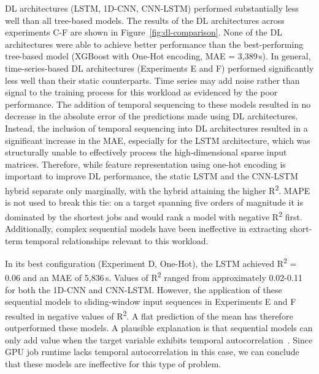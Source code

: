 DL architectures (LSTM, 1D-CNN, CNN-LSTM) performed substantially less well than all tree-based models. The results of the DL architectures across experiments C-F are shown in Figure~\ref{fig:dl-comparison}. None of the DL architectures were able to achieve better performance than the best-performing tree-based model (XGBoost with One-Hot encoding, MAE = 3{,}389\,s). In general, time-series-based DL architectures (Experiments E and F) performed significantly less well than their static counterparts. Time series may add noise rather than signal to the training process for this workload as evidenced by the poor performance. The addition of temporal sequencing to these models resulted in no decrease in the absolute error of the predictions made using DL architectures. Instead, the inclusion of temporal sequencing into DL architectures resulted in a significant increase in the MAE, especially for the LSTM architecture, which was structurally unable to effectively process the high-dimensional sparse input matrices. Therefore, while feature representation using one-hot encoding is important to improve DL performance, the static LSTM and the CNN-LSTM hybrid separate only marginally, with the hybrid attaining the higher R\textsuperscript{2}. MAPE is not used to break this tie: on a target spanning five orders of magnitude it is dominated by the shortest jobs and would rank a model with negative R\textsuperscript{2} first. Additionally, complex sequential models have been ineffective in extracting short-term temporal relationships relevant to this workload.

\clearpage
In its best configuration (Experiment D, One-Hot), the LSTM achieved R\textsuperscript{2} = 0.06 and an MAE of 5{,}836\,s. Values of R\textsuperscript{2} ranged from approximately 0.02-0.11 for both the 1D-CNN and CNN-LSTM. However, the application of these sequential models to sliding-window input sequences in Experiments E and F resulted in negative values of R\textsuperscript{2}. A flat prediction of the mean has therefore outperformed these models. A plausible explanation is that sequential models can only add value when the target variable exhibits temporal autocorrelation~\cite{hyndman2021fpp}. Since GPU job runtime lacks temporal autocorrelation in this case, we can conclude that these models are ineffective for this type of problem.

